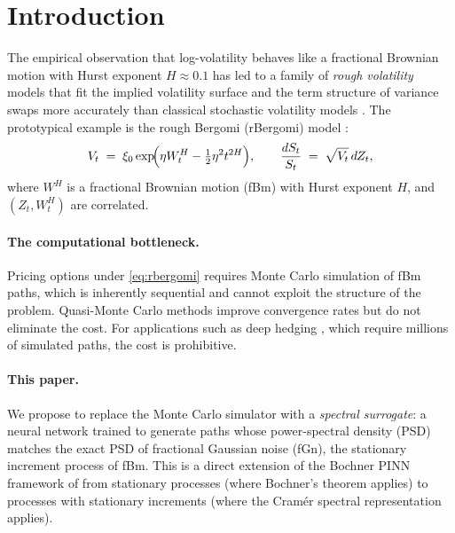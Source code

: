 \documentclass[11pt,a4paper]{article}
\begin{document}
\tableofcontents
\newpage

\section{Introduction}
\label{sec:intro}

The empirical observation that log-volatility behaves like a fractional
Brownian motion with Hurst exponent $H \approx 0.1$
\citep{gatheral2018volatility} has led to a family of \emph{rough
volatility} models that fit the implied volatility surface and the term
structure of variance swaps more accurately than classical stochastic
volatility models \citep{bayer2016pricing,ElEuch2019}. The prototypical
example is the rough Bergomi (rBergomi) model \citep{bayer2016pricing}:
\begin{equation}
 V_t \;=\; \xi_0 \exp\!\Bigl(\eta W^H_t - \tfrac{1}{2}\eta^2 t^{2H}\Bigr),
 \qquad
 \frac{dS_t}{S_t} \;=\; \sqrt{V_t}\,dZ_t,
 \label{eq:rbergomi}
\end{equation}
where $W^H$ is a fractional Brownian motion (fBm) with Hurst exponent
$H$, and $(Z_t, W^H_t)$ are correlated.

\paragraph{The computational bottleneck.}
Pricing options under \eqref{eq:rbergomi} requires Monte Carlo simulation
of fBm paths, which is inherently sequential and cannot exploit the
structure of the problem. Quasi-Monte Carlo methods improve convergence
rates \citep{bennedsen2017hybrid} but do not eliminate the cost. For
applications such as deep hedging \citep{buhler2019deep}, which require
millions of simulated paths, the cost is prohibitive.

\paragraph{This paper.}
We propose to replace the Monte Carlo simulator with a \emph{spectral
surrogate}: a neural network trained to generate paths whose
power-spectral density (PSD) matches the exact PSD of fractional Gaussian
noise (fGn), the stationary increment process of fBm. This is a direct
extension of the Bochner PINN framework of \citet{TODO-paper1}
from stationary processes (where Bochner's theorem applies) to processes
with stationary increments (where the Cramér spectral representation
applies).
\end{document}
